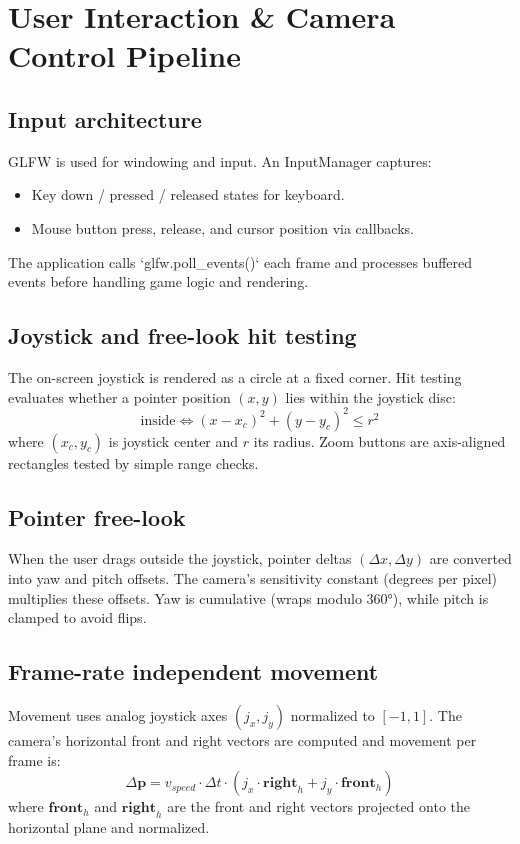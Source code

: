 \documentclass[12pt,a4paper]{report}
\begin{document}
\chapter{User Interaction \& Camera Control Pipeline}

\section{Input architecture}
GLFW is used for windowing and input. An InputManager captures:
\begin{itemize}
  \item Key down / pressed / released states for keyboard.
  \item Mouse button press, release, and cursor position via callbacks.
\end{itemize}
The application calls `glfw.poll_events()` each frame and processes buffered events before handling game logic and rendering.

\section{Joystick and free-look hit testing}
The on-screen joystick is rendered as a circle at a fixed corner. Hit testing evaluates whether a pointer position \((x,y)\) lies within the joystick disc:
\[
  \text{inside} \iff (x - x_c)^2 + (y - y_c)^2 \le r^2
\]
where \((x_c,y_c)\) is joystick center and \(r\) its radius. Zoom buttons are axis-aligned rectangles tested by simple range checks.

\section{Pointer free-look}
When the user drags outside the joystick, pointer deltas \((\Delta x, \Delta y)\) are converted into yaw and pitch offsets. The camera's sensitivity constant (degrees per pixel) multiplies these offsets. Yaw is cumulative (wraps modulo 360°), while pitch is clamped to avoid flips.

\section{Frame-rate independent movement}
Movement uses analog joystick axes \((j_x,j_y)\) normalized to \([-1,1]\). The camera's horizontal front and right vectors are computed and movement per frame is:
\[
  \Delta \mathbf{p} = v_{speed} \cdot \Delta t \cdot \left( j_x \cdot \mathbf{right}_{h} + j_y \cdot \mathbf{front}_{h} \right)
\]
where \( \mathbf{front}_{h}\) and \( \mathbf{right}_{h}\) are the front and right vectors projected onto the horizontal plane and normalized.
\end{document}
